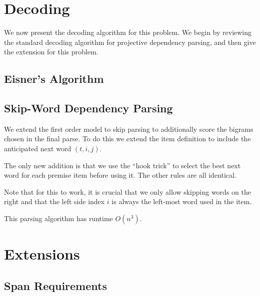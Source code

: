 \documentclass[11pt]{article}
\begin{document}





\section{Decoding}

We now present the decoding algorithm for this problem. We begin by reviewing the standard decoding algorithm for projective dependency parsing, and then give the extension for this problem. 

\subsection{Eisner's Algorithm}


\subsection{Skip-Word Dependency Parsing}


We extend the first order model to skip parsing to additionally score the bigrams chosen in the final parse. To do this we extend the item definition to include the anticipated next word $(t, i, j)$.

The only new addition is that we use the ``hook trick'' to select the best next word for each premise item before using it. The other rules are all identical.

Note that for this to work, it is crucial that we only allow skipping words on the right and that the left side index $i$ is always the left-most word used in the item.

This parsing algorithm has runtime $O(n^3)$.



\section{Extensions}

\subsection{Span Requirements}
\end{document}
